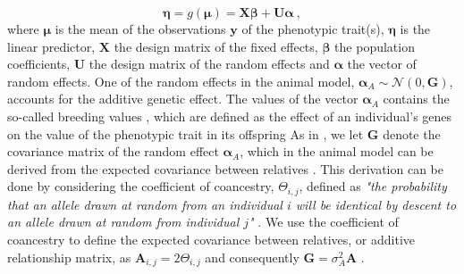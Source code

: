 \begin{equation}
    \boldsymbol{\eta} = g(\boldsymbol{\mu}) = \mathbf{X}\boldsymbol{\beta} + \mathbf{U}\boldsymbol{\alpha}\ ,
\end{equation}
where $\boldsymbol{\mu}$ is the mean of the observations $\mathbf{y}$ of the phenotypic trait(s), $\boldsymbol{\eta}$ is the linear predictor, $\mathbf{X}$ the design matrix of the fixed effects, $\boldsymbol{\beta}$ the population coefficients, $\mathbf{U}$ the design matrix of the random effects and $\boldsymbol{\alpha}$ the vector of random effects.
One of the random effects in the animal model, $\boldsymbol{\alpha}_A \sim \mathcal{N}(0, \mathbf{G})$,  accounts for the additive genetic effect. The values of the vector $\boldsymbol{\alpha}_A$ contains the so-called breeding values \citet{Wilson_guide_animal_model}, which are defined as the effect of an individual's genes on the value of the phenotypic trait in its offspring \citep{ConnerHartl2004} 
As in , we let $\mathbf{G}$ denote the covariance matrix of the random effect $\boldsymbol{\alpha}_A$, which in the animal model can be derived from the expected covariance between relatives \citep{Kruuk2004}.
This derivation can be done by considering the coefficient of coancestry, $\Theta_{i,j}$, defined as \textit{"the probability that an allele drawn at random from an individual $i$ will be identical by descent to an allele drawn at random from individual $j$"} \citep{Kruuk2004}. 
We use the coefficient of coancestry to define the expected covariance between relatives, or additive relationship matrix, as $\mathbf{A}_{i, j}=2\Theta_{i, j}$ and consequently $\mathbf{G}=\sigma^2_A\mathbf{A}$ \citep{Kruuk2004}. 
